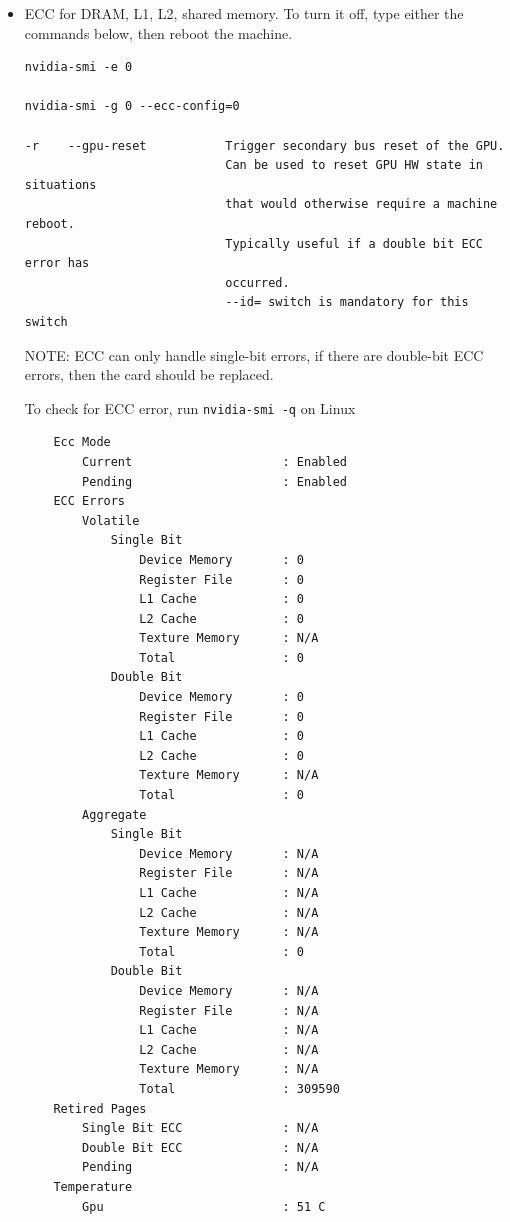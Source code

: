 \begin{itemize}
\item ECC for DRAM, L1, L2, shared memory. To turn it off, type
either the commands below, then reboot the  machine.
\begin{verbatim}
nvidia-smi -e 0

nvidia-smi -g 0 --ecc-config=0

-r    --gpu-reset           Trigger secondary bus reset of the GPU.
                            Can be used to reset GPU HW state in situations
                            that would otherwise require a machine reboot.
                            Typically useful if a double bit ECC error has
                            occurred.
                            --id= switch is mandatory for this switch
\end{verbatim}
NOTE: ECC can only handle single-bit errors, if there are double-bit ECC errors,
then the card should be replaced.

To check for ECC error, run \verb!nvidia-smi -q! on Linux
\begin{verbatim}
    Ecc Mode
        Current                     : Enabled
        Pending                     : Enabled
    ECC Errors
        Volatile
            Single Bit            
                Device Memory       : 0
                Register File       : 0
                L1 Cache            : 0
                L2 Cache            : 0
                Texture Memory      : N/A
                Total               : 0
            Double Bit            
                Device Memory       : 0
                Register File       : 0
                L1 Cache            : 0
                L2 Cache            : 0
                Texture Memory      : N/A
                Total               : 0
        Aggregate
            Single Bit            
                Device Memory       : N/A
                Register File       : N/A
                L1 Cache            : N/A
                L2 Cache            : N/A
                Texture Memory      : N/A
                Total               : 0
            Double Bit            
                Device Memory       : N/A
                Register File       : N/A
                L1 Cache            : N/A
                L2 Cache            : N/A
                Texture Memory      : N/A
                Total               : 309590
    Retired Pages
        Single Bit ECC              : N/A
        Double Bit ECC              : N/A
        Pending                     : N/A
    Temperature
        Gpu                         : 51 C


\end{verbatim}
\end{itemize}
